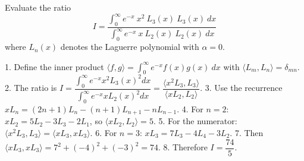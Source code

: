 Evaluate the ratio
$$
I = \frac{\int_{0}^{\infty} e^{-x}\ x^{2}\ L_3(x)\ L_3(x)\ dx}{\int_{0}^{\infty} e^{-x}\ x\ L_2(x)\ L_2(x)\ dx}
$$
where $L_n(x)$ denotes the Laguerre polynomial with $\alpha = 0$.

1.	Define the inner product $\langle f,g\rangle=\int_{0}^{\infty} e^{-x} f(x) g(x)\ dx$ with $\langle L_m,L_n\rangle=\delta_{mn}$.
2.	The ratio is $I=\dfrac{\int_{0}^{\infty} e^{-x} x^{2} L_3(x)^2 dx}{\int_{0}^{\infty} e^{-x} x L_2(x)^2 dx}=\dfrac{\langle x^2 L_3,L_3\rangle}{\langle xL_2,L_2\rangle}$.
3.	Use the recurrence $xL_n=(2n+1)L_n-(n+1)L_{n+1}-nL_{n-1}$.
4.	For $n=2$: $xL_2=5L_2-3L_3-2L_1$, so $\langle xL_2,L_2\rangle=5$.
5.	For the numerator: $\langle x^2 L_3,L_3\rangle=\langle xL_3,xL_3\rangle$.
6.	For $n=3$: $xL_3=7L_3-4L_4-3L_2$.
7.	Then $\langle xL_3,xL_3\rangle=7^2+(-4)^2+(-3)^2=74$.
8.	Therefore $I=\dfrac{74}{5}$.